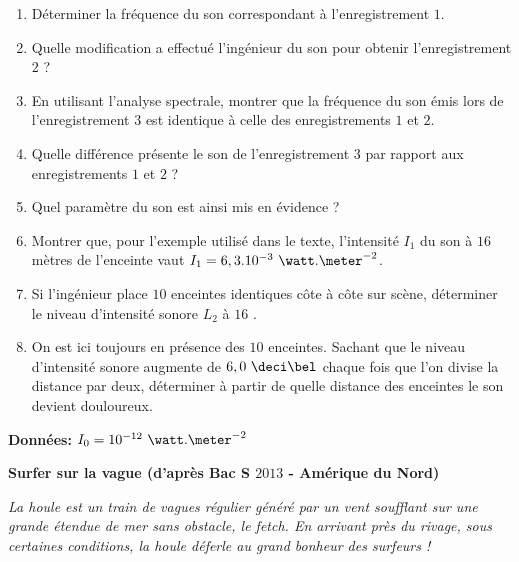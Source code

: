 \begin{enumerate}
\begin{enumerate}[label=(\alph*)]
\item Déterminer la fréquence du son correspondant à l'enregistrement $1$.
\item Quelle modification a effectué l'ingénieur du son pour obtenir l'enregistrement $2$ ?
\item En utilisant l'analyse spectrale, montrer que la fréquence du son émis lors de l'enregistrement $3$ est identique à celle des enregistrements $1$ et $2$.
\item Quelle différence présente le son de l'enregistrement $3$ par rapport aux enregistrements $1$ et $2$ ?
\item Quel paramètre du son est ainsi mis en évidence ?
\item Montrer que, pour l'exemple utilisé dans le texte, l'intensité $I_{1}$ du son à $16$ mètres de l'enceinte vaut $I_{1} = 6,3 . 10^{-3}\text{ }\watt.\meter^{-2}$.
\item Si l'ingénieur place $10$ enceintes identiques côte à côte sur scène, déterminer le niveau d'intensité sonore $L_{2}$ à $16$ \meter.
\item On est ici toujours en présence des $10$
enceintes. Sachant que le niveau d'intensité
sonore augmente de $6,0\text{ }\deci\bel$ chaque fois que l'on divise la distance par deux, déterminer à partir de quelle distance des enceintes le son
devient douloureux.
\end{enumerate}

\end{enumerate}

\vspace{0.3cm}

\textbf{Données: }$I_{0} = 10^{-12}\text{ }\watt.\meter^{-2}$

\vspace{0.3cm}

\exo \textbf{Surfer sur la vague (d'après Bac S $2013$ - Amérique du Nord)}

\vspace{0.3cm}

\textit{La houle est un train de vagues régulier généré par un vent soufflant sur une grande étendue de mer sans obstacle, le fetch. En arrivant près du rivage, sous certaines conditions, la houle déferle au grand
bonheur des surfeurs !}

\vspace{0.3cm}

